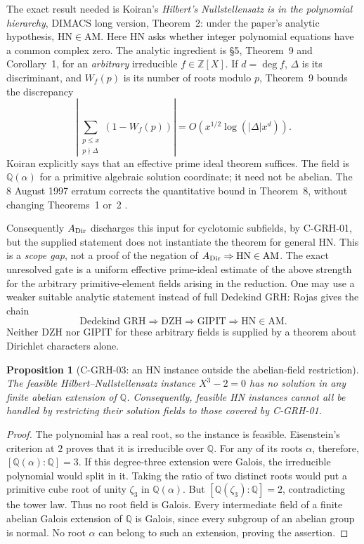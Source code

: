 \documentclass[11pt,a4paper]{article}
\newtheorem{proposition}{Proposition}[section]
\begin{document}
The exact result needed is Koiran's \emph{Hilbert's Nullstellensatz is in the
polynomial hierarchy}, DIMACS long version, Theorem~2: under the paper's
analytic hypothesis, \(\mathrm{HN}\in\mathrm{AM}\).  Here HN asks whether
integer polynomial equations have a common complex zero.  The analytic
ingredient is \S5, Theorem~9 and Corollary~1, for an \emph{arbitrary}
irreducible \(f\in\mathbb Z[X]\).  If \(d=\deg f\), \(\Delta\) is its
discriminant, and \(W_f(p)\) is its number of roots modulo \(p\), Theorem~9
bounds the discrepancy
\[
 \left|\sum_{\substack{p\le x\\p\nmid\Delta}}
                 (1-W_f(p))\right|
 =O\!\left(x^{1/2}\log(|\Delta|x^d)\right).
\]
Koiran explicitly says that an effective prime ideal theorem suffices.  The
field is \(\mathbb Q(\alpha)\) for a primitive algebraic solution coordinate;
it need not be abelian.  The 8 August 1997 erratum corrects the quantitative
bound in Theorem~8, without changing Theorems~1 or~2
\cite[Theorem~2; \S5, Theorem~9, Corollary~1; erratum]{CKoiran96}.

Consequently \(A_{\rm Dir}\) discharges this input for cyclotomic subfields,
by C-GRH-01, but the supplied statement does not instantiate the theorem for
general HN.  This is a \emph{scope gap}, not a proof of the negation of
\(A_{\rm Dir}\Rightarrow\mathrm{HN}\in\mathrm{AM}\).  The exact unresolved
gate is a uniform effective prime-ideal estimate of the above strength for
the arbitrary primitive-element fields arising in the reduction.  One may
use a weaker suitable analytic statement instead of full Dedekind GRH:
Rojas \cite[Theorem~1 and Theorem~2]{CRojas03} gives the chain
\[
 \text{Dedekind GRH}\Longrightarrow\mathrm{DZH}
 \Longrightarrow\mathrm{GIPIT}\Longrightarrow\mathrm{HN}\in\mathrm{AM}.
\]
Neither DZH nor GIPIT for these arbitrary fields is supplied by a theorem
about Dirichlet characters alone.

\begin{proposition}[C-GRH-03: an HN instance outside the abelian-field restriction]
The feasible Hilbert--Nullstellensatz instance \(X^3-2=0\) has no
solution in any finite abelian extension of \(\mathbb Q\).
Consequently, feasible HN instances cannot all be handled by restricting
their solution fields to those covered by C-GRH-01.
\end{proposition}
\begin{proof}
The polynomial has a real root, so the instance is feasible.
Eisenstein's criterion at \(2\) proves that it is irreducible over
\(\mathbb Q\).  For any of its roots \(\alpha\), therefore,
\([\mathbb Q(\alpha):\mathbb Q]=3\).
If this degree-three extension were Galois, the irreducible polynomial
would split in it.  Taking the ratio of two distinct roots would put
a primitive cube root of unity \(\zeta_3\) in \(\mathbb Q(\alpha)\).
But \([\mathbb Q(\zeta_3):\mathbb Q]=2\), contradicting the tower law.
Thus no root field is Galois.  Every intermediate field of a finite
abelian Galois extension of \(\mathbb Q\) is Galois, since every
subgroup of an abelian group is normal.  No root \(\alpha\) can belong
to such an extension, proving the assertion.
\end{proof}
\end{document}

